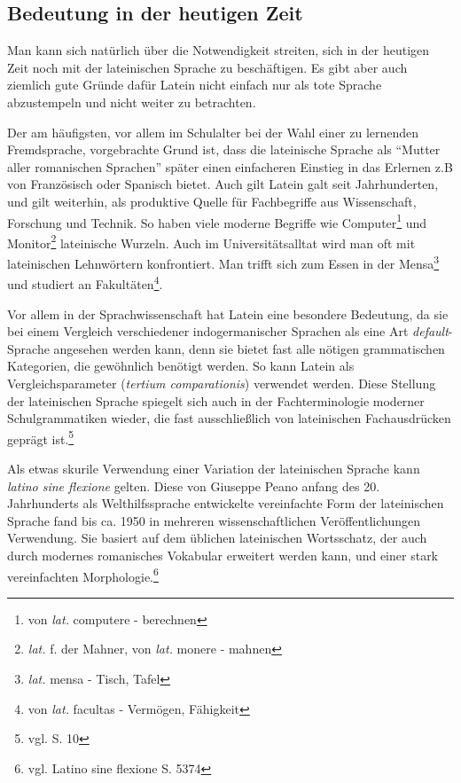 \documentclass[12pt,abstract=on,titlepage,bibliography=totoc,ngerman,listof=totoc]{scrreprt}
\begin{document}
\subsection{Bedeutung in der heutigen Zeit}
\label{subsec:bedeutung}
Man kann sich natürlich über die Notwendigkeit streiten, sich in der heutigen Zeit noch mit der lateinischen Sprache zu beschäftigen. Es gibt aber auch ziemlich gute Gründe dafür Latein nicht einfach nur als tote Sprache abzustempeln und nicht weiter zu betrachten. \par
Der am häufigsten, vor allem im Schulalter bei der Wahl einer zu lernenden Fremdsprache, vorgebrachte Grund ist, dass die lateinische Sprache als ``Mutter aller romanischen Sprachen'' später einen einfacheren Einstieg in das Erlernen z.B von Französisch oder Spanisch bietet. Auch gilt Latein galt seit Jahrhunderten, und gilt weiterhin, als produktive Quelle für Fachbegriffe aus Wissenschaft, Forschung und Technik. So haben viele moderne Begriffe wie Computer\footnote{von \textit{lat.} computere - berechnen} und Monitor\footnote{\textit{lat.} f. der Mahner, von \textit{lat.} monere - mahnen} lateinische Wurzeln. Auch im Universitätsalltat wird man oft mit lateinischen Lehnwörtern konfrontiert. Man trifft sich zum Essen in der Mensa\footnote{\textit{lat.} mensa - Tisch, Tafel} und studiert an Fakultäten\footnote{von \textit{lat.} facultas - Vermögen, Fähigkeit}. \par
Vor allem in der Sprachwissenschaft hat Latein eine besondere Bedeutung, da sie bei einem Vergleich verschiedener indogermanischer Sprachen als eine Art \textit{default}-Sprache angesehen werden kann, denn sie bietet fast alle nötigen grammatischen Kategorien, die gewöhnlich benötigt werden. So kann Latein als Vergleichsparameter (\textit{tertium comparationis}) verwendet werden. Diese Stellung der lateinischen Sprache spiegelt sich auch in der Fachterminologie moderner Schulgrammatiken wieder, die fast ausschließlich von lateinischen Fachausdrücken geprägt ist.\footnote{vgl. \cite{MUELLER-LANCE2006} S. 10} \par
Als etwas skurile Verwendung einer Variation der lateinischen Sprache kann \textit{latino sine flexione} gelten. Diese von Giuseppe Peano anfang des 20. Jahrhunderts als Welthilfssprache entwickelte vereinfachte Form der lateinischen Sprache fand bis ca. 1950 in mehreren wissenschaftlichen Veröffentlichungen Verwendung. Sie basiert auf dem üblichen lateinischen Wortsschatz, der auch durch modernes romanisches Vokabular erweitert werden kann, und einer stark vereinfachten Morphologie.\footnote{vgl. \cite{METZLER2004} Latino sine flexione S. 5374}
\pagebreak
\end{document}
